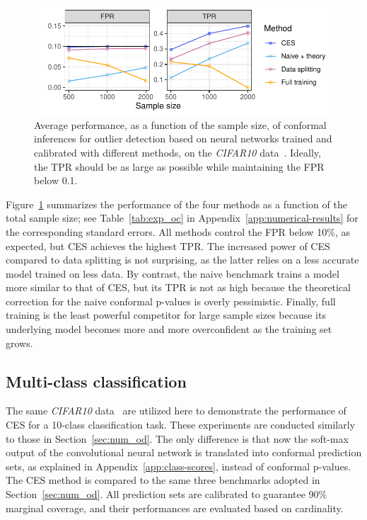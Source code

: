 \begin{figure}[!htb]
    \centering
    \includegraphics[width=\linewidth]{figures/exp_oc.pdf}\vspace{-0.5cm}
    \caption{Average performance, as a function of the sample size, of conformal inferences for outlier detection based on neural networks trained and calibrated with different methods, on the {\em CIFAR10} data~\cite{cifar10}. Ideally, the TPR should be as large as possible while maintaining the FPR below 0.1.}%
    \label{fig:exp_oc}
\end{figure}

Figure~\ref{fig:exp_oc} summarizes the performance of the four methods as a function of the total sample size; see Table~\ref{tab:exp_oc} in Appendix~\ref{app:numerical-results} for the corresponding standard errors. All methods control the FPR below 10\%, as expected, but CES achieves the highest TPR.
The increased power of CES compared to data splitting is not surprising, as the latter relies on a less accurate model trained on less data.
By contrast, the naive benchmark trains a model more similar to that of CES, but its TPR is not as high because the theoretical correction for the naive conformal p-values is overly pessimistic.
Finally, full training is the least powerful competitor for large sample sizes because its underlying model becomes more and more overconfident as the training set grows.

\subsection{Multi-class classification} \label{sec:num_mc}

The same {\em CIFAR10} data~\cite{cifar10} are utilized here to demonstrate the performance of CES for a 10-class classification task.
These experiments are conducted similarly to those in Section~\ref{sec:num_od}. The only difference is that now the soft-max output of the convolutional neural network is translated into conformal prediction sets, as explained in Appendix~\ref{app:class-scores}, instead of conformal p-values.
The CES method is compared to the same three benchmarks adopted in Section~\ref{sec:num_od}. All prediction sets are calibrated to guarantee 90\% marginal coverage, and their performances are evaluated based on cardinality.

